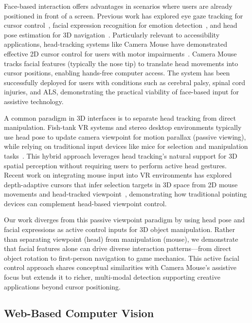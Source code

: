 \documentclass[sigconf]{acmart}
\begin{document}
Face-based interaction offers advantages in scenarios where users are already positioned in front of a screen. Previous work has explored eye gaze tracking for cursor control~\cite{majaranta2014eye}, facial expression recognition for emotion detection~\cite{tian2001recognizing}, and head pose estimation for 3D navigation~\cite{murphy2009head}. Particularly relevant to accessibility applications, head-tracking systems like Camera Mouse have demonstrated effective 2D cursor control for users with motor impairments~\cite{betke2002camera}. Camera Mouse tracks facial features (typically the nose tip) to translate head movements into cursor positions, enabling hands-free computer access. The system has been successfully deployed for users with conditions such as cerebral palsy, spinal cord injuries, and ALS, demonstrating the practical viability of face-based input for assistive technology.

A common paradigm in 3D interfaces is to separate head tracking from direct manipulation. Fish-tank VR systems and stereo desktop environments typically use head pose to update camera viewpoint for motion parallax (passive viewing), while relying on traditional input devices like mice for selection and manipulation tasks~\cite{teather2013pointing,ware1997selection}. This hybrid approach leverages head tracking's natural support for 3D spatial perception without requiring users to perform active head gestures. Recent work on integrating mouse input into VR environments has explored depth-adaptive cursors that infer selection targets in 3D space from 2D mouse movements and head-tracked viewpoint~\cite{zhou2022depth}, demonstrating how traditional pointing devices can complement head-based viewpoint control.

Our work diverges from this passive viewpoint paradigm by using head pose and facial expressions as active control inputs for 3D object manipulation. Rather than separating viewpoint (head) from manipulation (mouse), we demonstrate that facial features alone can drive diverse interaction patterns---from direct object rotation to first-person navigation to game mechanics. This active facial control approach shares conceptual similarities with Camera Mouse's assistive focus but extends it to richer, multi-modal detection supporting creative applications beyond cursor positioning.

\subsection{Web-Based Computer Vision}
\end{document}
